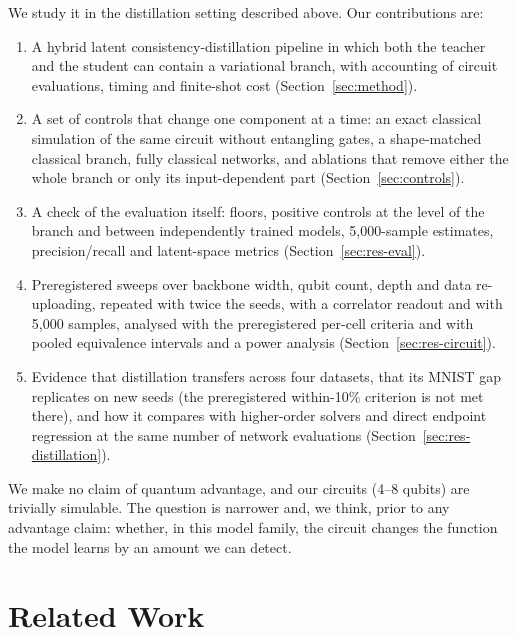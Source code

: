 \documentclass[11pt]{article}
\begin{document}
We study it in the distillation setting described above. Our contributions are:
\begin{enumerate}
  \item A hybrid latent consistency-distillation pipeline in which both the
  teacher and the student can contain a variational branch, with accounting of
  circuit evaluations, timing and finite-shot cost (Section~\ref{sec:method}).
  \item A set of controls that change one component at a time: an exact classical
  simulation of the same circuit without entangling gates, a shape-matched
  classical branch, fully classical networks, and ablations that remove either
  the whole branch or only its input-dependent part (Section~\ref{sec:controls}).
  \item A check of the evaluation itself: floors, positive controls at the level of
  the branch and between independently trained models, 5{,}000-sample estimates,
  precision/recall and latent-space metrics (Section~\ref{sec:res-eval}).
  \item Preregistered sweeps over backbone width, qubit count, depth and data
  re-uploading, repeated with twice the seeds, with a correlator readout and with
  5{,}000 samples, analysed with the preregistered per-cell criteria and with pooled
  equivalence intervals and a power analysis (Section~\ref{sec:res-circuit}).
  \item Evidence that distillation transfers across four datasets, that its MNIST
  gap replicates on new seeds (the preregistered within-10\% criterion is not met
  there), and how it compares with higher-order solvers and direct endpoint
  regression at the same number of network evaluations
  (Section~\ref{sec:res-distillation}).
\end{enumerate}

We make no claim of quantum advantage, and our circuits (4--8 qubits) are
trivially simulable. The question is narrower and, we think, prior to any
advantage claim: whether, in this model family, the circuit changes the
function the model learns by an amount we can detect.

\section{Related Work}
\end{document}
